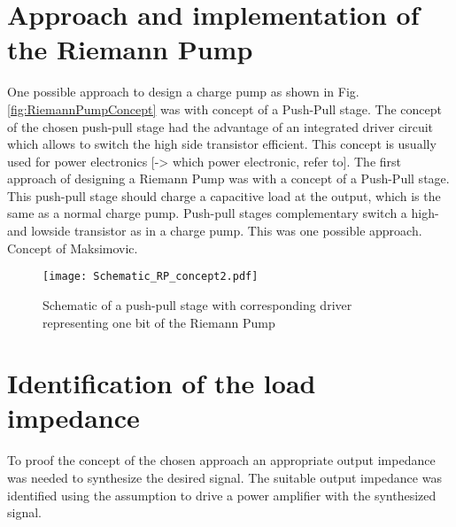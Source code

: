 \section{Approach and implementation of the Riemann Pump}
One possible approach to design a charge pump as shown in Fig. \ref{fig:RiemannPumpConcept} was with concept of a Push-Pull stage.
The concept of the chosen push-pull stage had the advantage of an integrated driver circuit which allows to switch the high side transistor efficient.
This concept is usually used for power electronics [-> which power electronic, refer to].
The first approach of designing a Riemann Pump was with a concept of a Push-Pull stage. This push-pull stage should charge a capacitive load at the output, which is the same as a normal charge pump. Push-pull stages complementary switch a high- and lowside transistor as in a charge pump. This was one possible approach. Concept of Maksimovic.




\begin{figure}[ht]
	\centering
  \texttt{[image: Schematic\_RP\_concept2.pdf]}
	\caption{Schematic of a push-pull stage with corresponding driver representing one bit of the Riemann Pump}
	\label{RiemannPump}
\end{figure}

%
%   
 
 
 
 


\section{Identification of the load impedance}
To proof the concept of the chosen approach an appropriate output impedance was needed to synthesize the desired signal.
The suitable output impedance was identified using the assumption to drive a power amplifier with the synthesized signal.

